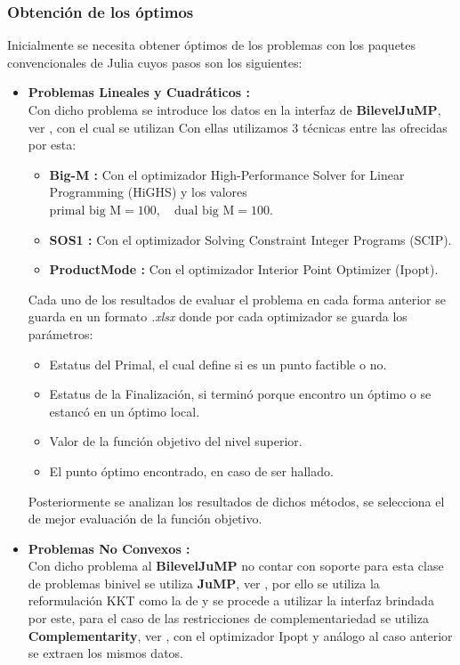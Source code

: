 \subsubsection{Obtención de los óptimos}
Inicialmente se necesita obtener óptimos de los problemas con los paquetes convencionales de Julia
cuyos pasos son los siguientes:
\begin{itemize}
    \item \textbf{Problemas Lineales y Cuadráticos :}\\
            Con dicho problema se introduce los datos en la interfaz de \textbf{BilevelJuMP}, ver \cite{BilevelJump}, con el cual se utilizan
            Con ellas utilizamos 3 técnicas entre las ofrecidas por esta:
            \begin{itemize}
                \item \textbf{Big-M :} Con el optimizador High-Performance Solver for Linear Programming (HiGHS) y los valores $\text{primal big M} = 100, \quad \text{dual big M} = 100$.
                \item \textbf{SOS1 :} Con el optimizador Solving Constraint Integer Programs (SCIP).
                \item \textbf{ProductMode :} Con el optimizador Interior Point Optimizer (Ipopt).
            \end{itemize} 
            Cada uno de los resultados de evaluar el problema en cada forma anterior se guarda en un formato \textit{.xlsx}
            donde por cada optimizador se guarda los parámetros:
            \begin{itemize}
                \item Estatus del Primal, el cual define si es un punto factible o no.
                \item Estatus de la Finalización, si terminó porque encontro un óptimo o se estancó en un óptimo local.
                \item Valor de la función objetivo del nivel superior.
                \item El punto óptimo encontrado, en caso de ser hallado.
            \end{itemize} 
            Posteriormente se analizan los resultados de dichos métodos, se selecciona el de mejor evaluación de la función objetivo.
    \item \textbf{Problemas No Convexos :}\\
            Con dicho problema al \textbf{BilevelJuMP} no contar con soporte para esta clase de problemas binivel se utiliza \textbf{JuMP}, ver \cite{JuMPPaper}, 
            por ello se utiliza la reformulación KKT como la de  y se procede a utilizar la interfaz brindada por este, para el caso de las restricciones de 
            complementariedad se utiliza \textbf{Complementarity}, ver \cite{Complementarityjl}, con el optimizador Ipopt y análogo al caso anterior se extraen los mismos datos.
\end{itemize}


